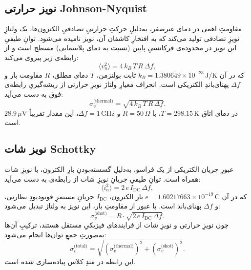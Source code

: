 \subsection{نویز حرارتی Johnson-Nyquist}

مقاومتِ اهمی در دمای غیرصفر، به‌دلیلِ حرکتِ حرارتیِ تصادفیِ الکترون‌ها، یک ولتاژِ نویزِ تصادفی تولید می‌کند که به افتخارِ کاشفان آن، نویز  نامیده می‌شود. توانِ طیفیِ این نویز در محدوده‌ی فرکانسیِ پایین (نسبت به دمای پلاسمایی) مسطح است و از رابطه‌ی زیر پیروی می‌کند:
\begin{equation}
	\langle v_n^2 \rangle = 4\,k_B\,T\,R\,\Delta f,
	\label{eq:johnson-noise}
\end{equation}
که در آن $k_B = 1.380649 \times 10^{-23}\,\text{J/K}$ ثابت بولتزمن، $T$ دمای مطلق، $R$ مقاومت بار  و $\Delta f$ پهنای‌باندِ الکتریکی است. انحراف معیارِ ولتاژ نویزِ حرارتی از ریشه‌گیریِ رابطه‌ی فوق به دست می‌آید:
\begin{equation}
	\sigma_v^{\text{(thermal)}} = \sqrt{4\,k_B\,T\,R\,\Delta f}.
	\label{eq:thermal-std}
\end{equation}
در دمای اتاق $T = 298.15\,\text{K}$، با $R = 50\,\Omega$ و $\Delta f = 1\,\text{GHz}$، این مقدار تقریباً $28.9\,\mu\text{V}$ است.

\subsection{نویز شات Schottky}

عبورِ جریان الکتریکی از یک فراسو، به‌دلیلِ گسسته‌بودنِ بارِ الکترون، با نویزِ شات همراه است. توانِ طیفیِ جریانِ نویزِ شات از رابطه‌ی  به دست می‌آید:
\begin{equation}
	\langle i_n^2 \rangle = 2\,e\,I_{\text{DC}}\,\Delta f,
	\label{eq:shot-noise}
\end{equation}
که در آن $e = 1.60217663 \times 10^{-19}\,\text{C}$ بار الکترون، $I_{\text{DC}}$ جریانِ مستمرِ فوتودیودِ نظارتی، و $\Delta f$ پهنای‌باند است. با عبور از مقاومتِ بار، این نویز به ولتاژ تبدیل می‌شود:
\begin{equation}
	\sigma_v^{\text{(shot)}} = R \cdot \sqrt{2\,e\,I_{\text{DC}}\,\Delta f}.
	\label{eq:shot-std}
\end{equation}
چون نویزِ حرارتی و نویزِ شات از فرایندهای فیزیکیِ مستقل هستند، ترکیبِ آن‌ها به‌صورتِ جمعِ توان‌ها انجام می‌شود:
\begin{equation}
	\sigma_v^{\text{(total)}} = \sqrt{(\sigma_v^{\text{(thermal)}})^2 + (\sigma_v^{\text{(shot)}})^2}.
	\label{eq:total-noise}
\end{equation}
این رابطه در متدِ  کلاس  پیاده‌سازی شده است.

